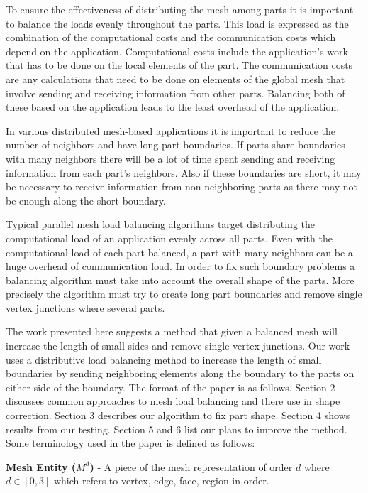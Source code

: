 \documentclass{thesis}
\begin{document}
To ensure the effectiveness of distributing the mesh among parts it is important to balance the loads evenly throughout the parts. This load is expressed as the combination of the computational costs and the communication costs which depend on the application. Computational costs include the application's work that has to be done on the local elements of the part. The communication costs are any calculations that need to be done on elements of the global mesh that involve sending and receiving information from other parts.  Balancing both of these based on the application leads to the least overhead of the application.

In various distributed mesh-based applications it is important to reduce the 
number of neighbors and have long part boundaries. If parts share boundaries 
with many neighbors there will be a lot of time spent sending and receiving 
information from each part's neighbors. Also if these boundaries are short, it 
may be necessary to receive information from non neighboring parts as there 
may not be enough along the short boundary. 

Typical parallel mesh load balancing algorithms target distributing the 
computational load of an application evenly across all parts. Even with the 
computational load of each part balanced, a part with many neighbors can be a 
huge overhead of communication load. In order to fix such boundary problems a 
balancing algorithm must take into account the overall shape of the parts. 
More precisely the algorithm must try to create long part boundaries and remove 
single vertex junctions where several parts.

The work presented here suggests a method that given a balanced mesh will 
increase the length of small sides and remove single vertex junctions. Our work 
uses a distributive load balancing method to increase the length of small 
boundaries by sending neighboring elements along the boundary to the parts on 
either side of the boundary. The format of the paper is as follows. Section 2 
discusses common approaches to mesh load balancing and there use in shape 
correction. Section 3 describes our algorithm to fix part shape. Section 4 
shows results from our testing. Section 5 and 6 list our plans to improve the 
method. Some terminology used in the paper is defined as follows:

{\bf Mesh Entity ($M^d$)} - A piece of the mesh representation of order $d$ where $d \in [0,3]$ which refers to vertex, edge, face, region in order.
\end{document}
